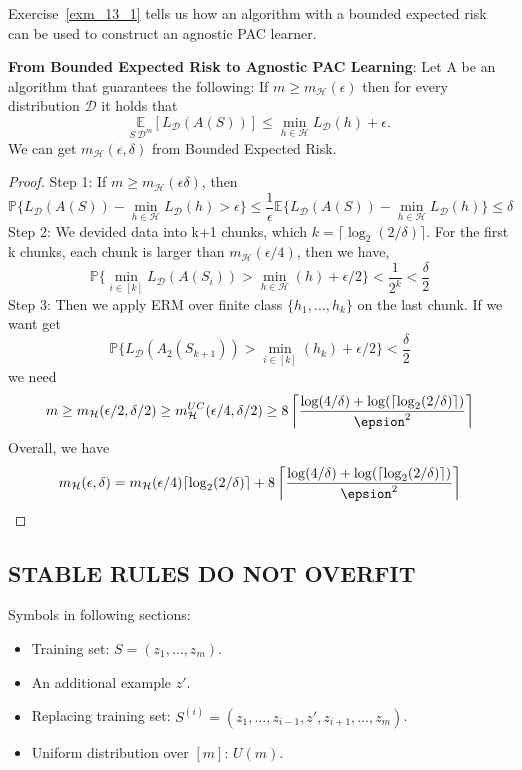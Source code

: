 Exercise~\ref{exm_13_1} tells us how an algorithm with a bounded expected risk can be used to construct an agnostic PAC learner.
\begin{exm}
	\label{exm_13_1}
	\textbf{From Bounded Expected Risk to Agnostic PAC Learning}:
	Let A be an algorithm that guarantees the following: If $ m \ge m_\mathcal{H}(\epsilon) $
	then for every distribution $ \mathcal{D} $ it holds that
	\[ 
		\underset{ S ~ \mathcal{D}^m} {\mathbb{E}} [L_\mathcal{D}(A(S))]
		\le \min\limits_{h\in\mathcal{H}} L_\mathcal{D}(h)+\epsilon.
	\]
	We can get $ m_\mathcal{H}(\epsilon, \delta) $ from Bounded Expected Risk.
	\begin{proof}
		Step 1: If $ m \ge m_\mathcal{H}(\epsilon \delta) $, then
		\[ 
			\mathbb{P} \{ L_\mathcal{D}(A(S)) - \min\limits_{h\in\mathcal{H}} L_\mathcal{D}(h) > \epsilon \}
			\le \frac{1}{\epsilon} 
			\mathbb{E} \{ L_\mathcal{D}(A(S)) - \min\limits_{h\in\mathcal{H}} L_\mathcal{D}(h) \}
			\le \delta
		\]
		Step 2:
		We devided data into k+1 chunks, which $ k = \lceil \log_2(2/\delta) \rceil $.
		For the first k chunks, each chunk is larger than $ m_\mathcal{H}(\epsilon/4) $, 
		then we have,
		\[ 
			\mathbb{P} \{ \min\limits_{i \in [k]} L_\mathcal{D}(A(S_i)) > \min\limits_{h \in \mathcal{H}} (h) + \epsilon/2  \}
			< \frac{1}{2^{k}} < \frac{\delta}{2}
		\]
		Step 3:
		Then we apply ERM over finite class $ \{ h_1, \dots, h_{k} \} $ on the last chunk.
		If we want get
		\[ 
			\mathbb{P} \{ L_\mathcal{D}(A_2(S_{k+1})) > \min\limits_{i \in [k]}(h_k) + \epsilon/2 \}
			< \frac{\delta}{2} 
		\]
		we need
		\[ 
			m \ge m_\mathcal{H}(\epsilon/2, \delta/2) \ge m^{UC}_{\mathcal{H}}(\epsilon/4, \delta/2)
			\ge 8 \left\lceil
				\frac{\log(4/\delta) + \log(\lceil \log_2(2/\delta) \rceil)}{\epsion^2}
				\right\rceil
		\]
		Overall, we have
		\[ 
			m_\mathcal{H}(\epsilon, \delta) = 
			m_\mathcal{H}(\epsilon/4)\lceil \log_2(2/\delta) \rceil
			+ 
			8 \left\lceil
				\frac{\log(4/\delta) + \log(\lceil \log_2(2/\delta) \rceil)}{\epsion^2}
				\right\rceil
		\]
		
	\end{proof}
\end{exm}

\subsection{STABLE RULES DO NOT OVERFIT}

Symbols in following sections:
\begin{itemize}
	\item Training set: $ S = (z_1, \dots, z_m) $.
	\item An additional example $ z' $.
	\item Replacing training set: $ S^{(i)} = (z_1, \dots, z_{i-1}, z', z_{i+1}, \dots, z_m) $.
	\item Uniform distribution over $ [m] $: $ U(m) $.
\end{itemize}

